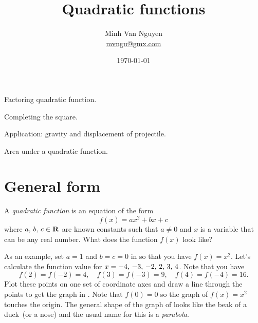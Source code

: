 \documentclass[a4paper,oneside,12pt]{article}
\begin{document}
\title{\Large\bf Quadratic functions}
\author{%
  Minh Van Nguyen \\
  \url{mvngu@gmx.com}
}
\date{\today}
\maketitle

\begin{packeditem}
\item Factoring quadratic function.

\item Completing the square.

\item Application: gravity and displacement of projectile.

\item Area under a quadratic function.
\end{packeditem}



\section{General form}
\label{sec:general_form}

A \emph{quadratic function} is an equation of the form
\begin{equation}
\label{eqn:general_quadratic_function}
f(x)
=
ax^2 + bx + c
\end{equation}
where ${a},\, {b},\, {c} \in \mathbf{R}$ are known constants such that
$a \neq 0$ and $x$ is a variable that can be any real number.  What
does the function $f(x)$ look like?

As an example, set $a = 1$ and $b = c = 0$ in
 so that you have
$f(x) = x^2$.  Let's calculate the function value for
$x = {-4},\, {-3},\, {-2},\, {2},\, {3},\, {4}$.  Note that you have
\[
f(2) = f(-2) = 4,
\quad
f(3) = f(-3) = 9,
\quad
f(4) = f(-4) = 16.
\]
Plot these points on one set of coordinate axes and draw a line
through the points to get the graph in .
Note that $f(0) = 0$ so the graph of $f(x) = x^2$ touches the origin.
The general shape of the graph of
 looks like the beak of a
duck~(or a nose) and the usual name for this is a \emph{parabola}.
\end{document}
